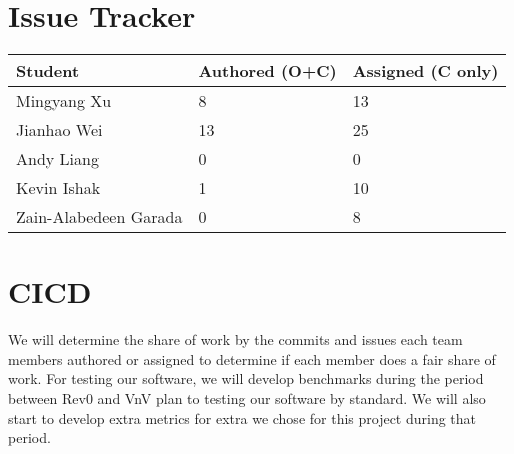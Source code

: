 \documentclass{article}
\begin{document}

\section{Issue Tracker}


\begin{table}[H]
\centering
\begin{tabular}{lll}
\toprule
\textbf{Student} & \textbf{Authored (O+C)} & \textbf{Assigned (C only)}\\
\midrule
Mingyang Xu & 8 & 13 \\
Jianhao Wei & 13 & 25 \\
Andy Liang & 0 & 0 \\
Kevin Ishak & 1 & 10 \\
Zain-Alabedeen Garada & 0 & 8 \\
\bottomrule
\end{tabular}
\end{table}



\section{CICD}



We will determine the share of work by the commits and issues each team members authored or assigned to determine if each member does a fair share of work. For testing our software, we will develop benchmarks during the period between Rev0 and VnV plan to testing our software by standard. We will also start to develop extra metrics for extra we chose for this project during that period.
\end{document}
